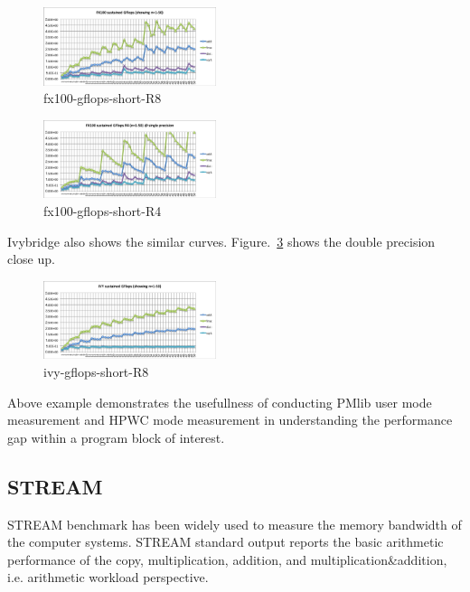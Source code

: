 \documentclass[conference]{IEEEtran}
\begin{document}
\begin{figure}[tb]
\centering
\includegraphics[width=0.45\textwidth]{figs/fx100-gflops-short-R8.pdf}
\caption{fx100-gflops-short-R8}
\label{fig:fx100-gflops-short-R8}
\end{figure}


\begin{figure}[tb]
\centering
\includegraphics[width=0.45\textwidth]{figs/fx100-gflops-short-R4.pdf}
\caption{fx100-gflops-short-R4}
\label{fig:fx100-gflops-short-R4}
\end{figure}

Ivybridge also shows the similar curves.
Figure.~\ref{fig:ivy-gflops-short-R8} shows the double precision close up.
\begin{figure}[tb]
\centering
\includegraphics[width=0.45\textwidth]{figs/ivy-gflops-short-R8.pdf}
\caption{ivy-gflops-short-R8}
\label{fig:ivy-gflops-short-R8}
\end{figure}
Above example demonstrates the usefullness of conducting PMlib user mode
measurement and HPWC mode measurement in understanding the performance
gap within a program block of interest.

%
\subsection{STREAM}
\label{subsection:STREAM}
STREAM benchmark \cite{stream:1995}
has been widely used to measure the memory bandwidth of the computer systems.
STREAM standard output reports the
basic arithmetic performance of the copy, multiplication, addition,
and multiplication\&addition, i.e. arithmetic workload perspective.
\end{document}
